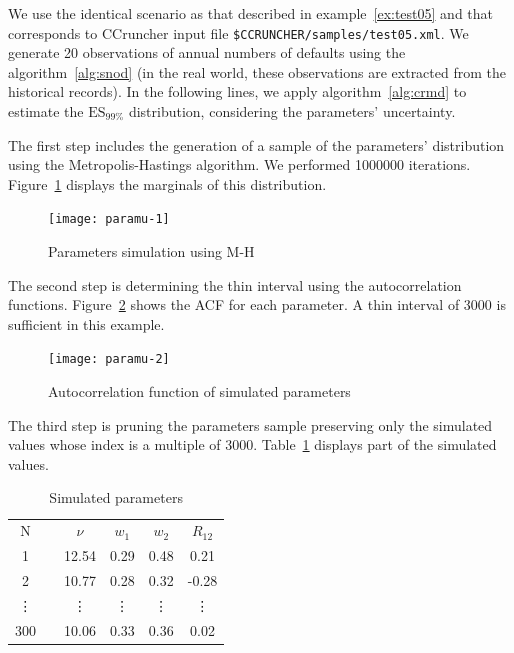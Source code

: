 \documentclass[11pt,fleqn]{book} %
\begin{document}
\begin{example}
	\label{ex:paramu}
	We use the identical scenario as that described in example~\ref{ex:test05} 
	and that corresponds to CCruncher input file 
	\texttt{\$CCRUNCHER/samples/test05.xml}. 
	We generate 20 observations of annual numbers of defaults using the 
	algorithm~\ref{alg:snod} (in the real world, these observations are 
	extracted from the historical records). 
	In the following lines, we apply algorithm~\ref{alg:crmd} to estimate 
	the $\text{ES}_{99\%}$ distribution, considering the parameters' 
	uncertainty. 

	The first step includes the generation of a sample of the parameters' 
	distribution using the Metropolis-Hastings algorithm. We performed 
	\num{1000000} iterations. Figure~\ref{fig:paramu1} displays the 
	marginals of this distribution.
	\begin{figure}[!ht]
		\centering
		\texttt{[image: paramu-1]}
		\caption{Parameters simulation using M-H}
		\label{fig:paramu1}
	\end{figure}
	
	The second step is determining the thin interval using the autocorrelation 
	functions. Figure~\ref{fig:paramu2} shows the ACF for each parameter. 
	A thin interval of \num{3000} is sufficient in this example. 
	\begin{figure}[ht]
		\centering
		\texttt{[image: paramu-2]}
		\caption{Autocorrelation function of simulated parameters}
		\label{fig:paramu2}
	\end{figure}
	
	The third step is pruning the parameters sample preserving 
	only the simulated values whose index is a multiple of \num{3000}. 
	Table~\ref{tab:paramu3} displays part of the simulated values.
	\begin{table}[!ht]
		\centering
		\begin{tabular}{cc|c|c|c|c|}
			\cline{1-1} \cline{3-6}
			\multicolumn{1}{|c|}{N} & & $\nu$ & $w_1$ & $w_2$ & $R_{12}$ \\
			\cline{1-1} \cline{3-6}
			\multicolumn{1}{|c|}{1} & & 12.54 & 0.29 & 0.48 & 0.21 \\
			\cline{1-1} \cline{3-6}
			\multicolumn{1}{|c|}{2} & & 10.77 & 0.28 & 0.32 & -0.28 \\
			\cline{1-1} \cline{3-6}
			\multicolumn{1}{|c|}{\vdots} & & \vdots & \vdots & \vdots & \vdots \\
			\cline{1-1} \cline{3-6}
			\multicolumn{1}{|c|}{300} & & 10.06 & 0.33 & 0.36 & 0.02 \\
			\cline{1-1} \cline{3-6}
		\end{tabular}
		\caption{Simulated parameters}
		\label{tab:paramu3}
	\end{table}


\end{example}
\end{document}
